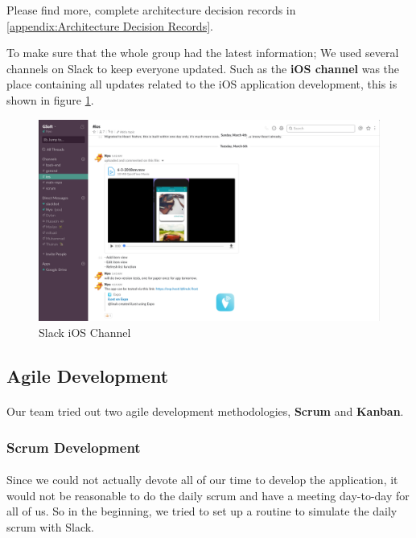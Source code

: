\documentclass[12pt,a4paper]{article}
\begin{document}
        Please find more, complete architecture decision records in \ref{appendix:Architecture Decision Records}.
        
        To make sure that the whole group had the latest information; We used several channels on Slack to keep everyone updated. Such as the {\bf iOS channel} was the place containing all updates related to the iOS application development, this is shown in figure \ref{fig:Slack iOS Channel}. 
        
        \begin{figure}[H]
          \centering
          \includegraphics[width=1\textwidth]{../assets/development-records-slack-ios-channel.png}
          \caption{Slack iOS Channel}
          \label{fig:Slack iOS Channel}
        \end{figure}

      \subsection{Agile Development} 
        
        \paragraph{}Our team tried out two agile development methodologies, {\bf Scrum} and {\bf Kanban}.

        \subsubsection{Scrum Development}
          \paragraph{}Since we could not actually devote all of our time to develop the application, it would not be reasonable to do the daily scrum and have a meeting day-to-day for all of us. So in the beginning, we tried to set up a routine to simulate the daily scrum with Slack.
\end{document}
